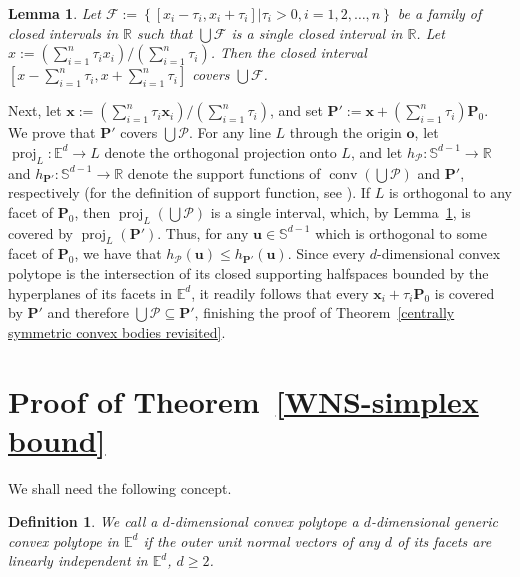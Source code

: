 \documentclass[12pt]{article}
\newtheorem{lem}{Lemma}
\newtheorem{defn}{Definition}
\DeclareMathOperator{\conv}{conv}
\DeclareMathOperator{\proj}{proj}
\newcommand{\xx}{\mathbf{x}}
\renewcommand{\Re}{\mathbb{R}}
\newcommand{\Sph}{\mathbb{S}}
\newcommand{\Ee}{{\mathbb E}}
\newcommand{\F}{\mathcal{F}}
\begin{document}
\begin{lem}\label{lem:GG}
Let $\F := \left\{ [x_i-\tau_i, x_i + \tau_i ] | \tau_i > 0, i=1,2,\ldots, n\right\}$ be a family of closed intervals in $\Re$ such that $\bigcup \F$ is a single closed interval in $\Re$. Let $x := \left( \sum_{i=1}^n \tau_i x_i \right) / \left( \sum_{i=1}^n \tau_i \right)$. Then the closed interval
$ 
\left[ x - \sum_{i=1}^n \tau_i , x + \sum_{i=1}^n \tau_i \right]
$
covers $\bigcup \F$.
\end{lem}
Next, let $\xx := \left( \sum_{i=1}^n \tau_i \xx_i \right) / \left( \sum_{i=1}^n \tau_i \right)$, and set $\mathbf{P}' := \xx + \left( \sum_{i=1}^n \tau_i \right) \mathbf{P}_0$. We prove that $\mathbf{P}'$ covers $\bigcup \mathcal{P}$. For any line $L$ through the origin $\mathbf{o}$, let $\proj_L : \Ee^d \to L$ denote the orthogonal projection onto $L$, and let $h_{\mathcal{P} }: \Sph^{d-1} \to \Re$ and $h_{\mathbf{P}'} : \Sph^{d-1} \to \Re$ denote the support functions of $\conv\left( \bigcup \mathcal{P} \right)$ and $\mathbf{P}'$, respectively (for the definition of support function, see \cite{Sch14}).
If $L$ is orthogonal to any facet of $\mathbf{P}_0$, then $\proj_L \left( \bigcup \mathcal{P} \right)$ is a single interval, which, by Lemma~\ref{lem:GG}, is covered by $\proj_L \left( \mathbf{P}' \right)$.
Thus, for any $\mathbf{u} \in \Sph^{d-1}$ which is orthogonal to some facet of $\mathbf{P}_0$, we have that $h_{\mathcal{P}}(\mathbf{u}) \leq h_{\mathbf{P}'}(\mathbf{u})$. Since every $d$-dimensional convex polytope is the intersection of its closed supporting halfspaces bounded by the hyperplanes of its facets in $\Ee^d$, it readily follows that every $\xx_i + \tau_i \mathbf{P}_0$ is covered by $ \mathbf{P}'$ and therefore $\bigcup \mathcal{P} \subseteq \mathbf{P}'$, finishing the proof of Theorem~\ref{centrally symmetric convex bodies revisited}. 


\section{Proof of Theorem~\ref{WNS-simplex bound}}

We shall need the following concept.

\begin{defn}
We call a $d$-dimensional convex polytope a {\rm $d$-dimensional generic convex polytope in $\Ee^d$ } if the outer unit normal vectors of any $d$ of its facets are linearly independent in $\Ee^d$, $d\geq 2$.
\end{defn}
\end{document}
